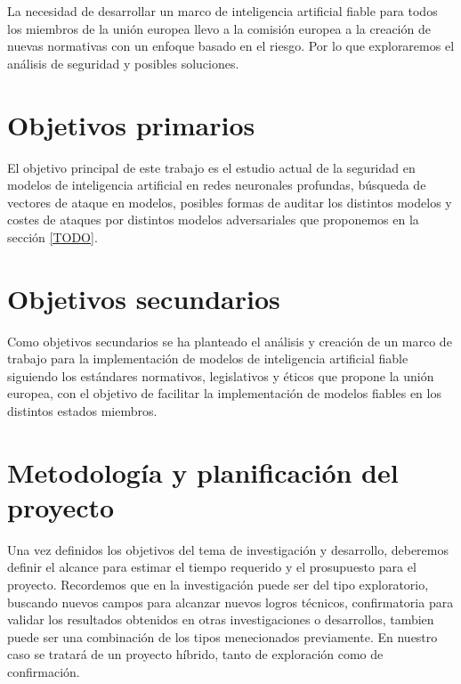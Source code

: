 La necesidad de desarrollar un marco de inteligencia artificial fiable para todos los miembros de la unión europea llevo a la comisión europea a la creación de nuevas normativas con un enfoque basado en el riesgo.
Por lo que exploraremos el análisis de seguridad y posibles soluciones.


\section{Objetivos primarios}
El objetivo principal de este trabajo es el estudio actual de la seguridad en modelos de inteligencia artificial en redes neuronales profundas, búsqueda de vectores de ataque en modelos, posibles formas de auditar los distintos modelos y costes de ataques por distintos modelos adversariales que proponemos en la sección \ref{TODO}.


\section{Objetivos secundarios}
Como objetivos secundarios se ha planteado el análisis y creación de un marco de trabajo para la implementación de modelos de inteligencia artificial fiable siguiendo los estándares normativos, legislativos y éticos que propone la unión europea, con el objetivo de facilitar la implementación de modelos fiables en los distintos estados miembros.

\section{Metodología y planificación del proyecto}

Una vez definidos los objetivos del tema de investigación y desarrollo, deberemos definir el alcance para estimar el tiempo requerido y el prosupuesto para el proyecto.
Recordemos que en la investigación puede ser del tipo exploratorio, buscando nuevos campos para alcanzar nuevos logros técnicos, confirmatoria para validar los resultados obtenidos en otras investigaciones o desarrollos, tambien puede ser una combinación de los tipos menecionados previamente.
En nuestro caso se tratará de un proyecto híbrido, tanto de exploración como de confirmación.

